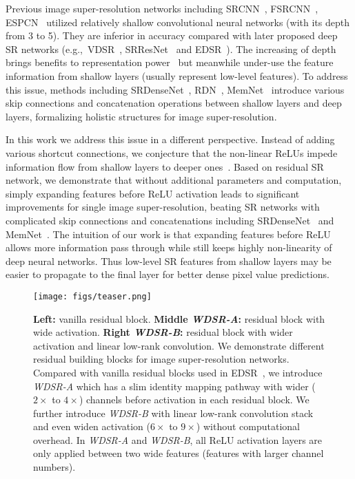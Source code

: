 \documentclass{article}
\begin{document}
Previous image super-resolution networks including SRCNN~\cite{dong2014learning}, FSRCNN~\cite{dong2016accelerating}, ESPCN~\cite{shi2016real} utilized relatively shallow convolutional neural networks (with its depth from 3 to 5). They are inferior in accuracy compared with later proposed deep SR networks (e.g.,\ VDSR~\cite{kim2016accurate}, SRResNet~\cite{ledig2016photo} and EDSR~\cite{lim2017enhanced}). The increasing of depth brings benefits to representation power~\cite{cohen2016expressive, eldan2016power, liang2016deep, scarselli1998universal} but meanwhile under-use the feature information from shallow layers (usually represent low-level features). To address this issue, methods including SRDenseNet~\cite{tong2017image}, RDN~\cite{2018arXiv180208797Z}, MemNet~\cite{tai2017memnet} introduce various skip connections and concatenation operations between shallow layers and deep layers, formalizing holistic structures for image super-resolution.

In this work we address this issue in a different perspective. Instead of adding various shortcut connections, we conjecture that the non-linear ReLUs impede information flow from shallow layers to deeper ones~\cite{sandler2018inverted}. Based on residual SR network, we demonstrate that without additional parameters and computation, simply expanding features before ReLU activation leads to significant improvements for single image super-resolution, beating SR networks with complicated skip connections and concatenations including SRDenseNet~\cite{tong2017image} and MemNet~\cite{tai2017memnet}. The intuition of our work is that expanding features before ReLU allows more information pass through while still keeps highly non-linearity of deep neural networks. Thus low-level SR features from shallow layers may be easier to propagate to the final layer for better dense pixel value predictions.

\begin{figure}[t]
\centering
\texttt{[image: figs/teaser.png]}
\caption{\textbf{Left:} vanilla residual block. \textbf{Middle \textit{WDSR-A}:} residual block with wide activation. \textbf{Right \textit{WDSR-B}:} residual block with wider activation and linear low-rank convolution. We demonstrate different residual building blocks for image super-resolution networks. Compared with vanilla residual blocks used in EDSR~\cite{lim2017enhanced}, we introduce \textit{WDSR-A} which has a slim identity mapping pathway with wider (\(2\times\) to \(4\times\)) channels before activation in each residual block. We further introduce \textit{WDSR-B} with linear low-rank convolution stack and even widen activation (\(6\times\) to \(9\times\)) without computational overhead. In \textit{WDSR-A} and \textit{WDSR-B}, all ReLU activation layers are only applied between two wide features (features with larger channel numbers).}
\label{fig:wide}
\end{figure}
\end{document}
